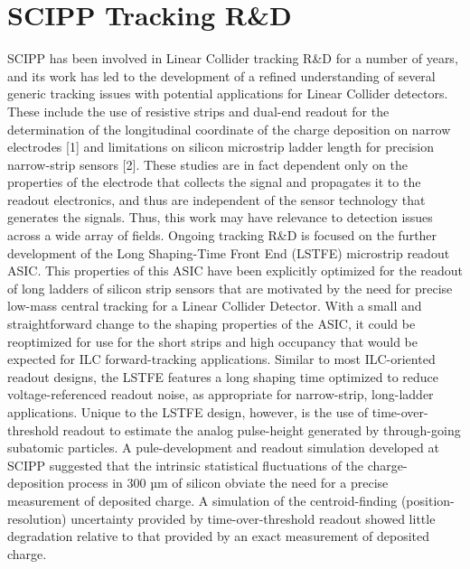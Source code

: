 \section{SCIPP Tracking R\&D}
SCIPP has been involved in Linear Collider tracking R\&D for a number of years, and its work has led to the development of a refined understanding of several generic tracking issues with potential applications for Linear Collider detectors. These include the use of resistive strips and dual-end readout for the determination of the longitudinal coordinate of the charge deposition on narrow electrodes [1] and limitations on silicon microstrip ladder length for precision narrow-strip sensors [2]. These studies are in fact dependent only on the properties of the electrode that collects the signal and propagates it to the readout electronics, and thus are independent of the sensor technology that generates the signals. Thus, this work may have relevance to detection issues across a wide array of fields.
Ongoing tracking R\&D is focused on the further development of the Long Shaping-Time Front End (LSTFE) microstrip readout ASIC. This properties of this ASIC have been explicitly optimized for the readout of long ladders of silicon strip sensors that are motivated by the need for precise low-mass central tracking for a Linear Collider Detector. With a small and straightforward change to the shaping properties of the ASIC, it could be reoptimized for use for the short strips and high occupancy that would be expected for ILC forward-tracking applications.
Similar to most ILC-oriented readout designs, the LSTFE features a long shaping time optimized to reduce voltage-referenced readout noise, as appropriate for narrow-strip, long-ladder applications. Unique to the LSTFE design, however, is the use of time-over-threshold readout to estimate the analog pulse-height generated by through-going subatomic particles. A pule-development and readout simulation developed at SCIPP suggested that the intrinsic statistical fluctuations of the charge-deposition process in 300 µm of silicon obviate the need for a precise measurement of deposited charge. A simulation of the centroid-finding (position-resolution) uncertainty provided by time-over-threshold readout showed little degradation relative to that provided by an exact measurement of deposited charge.
